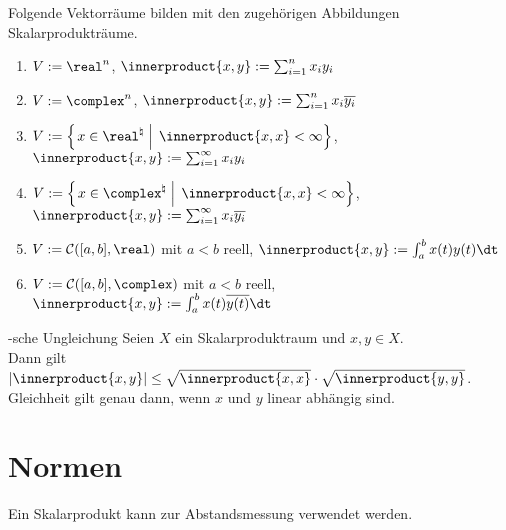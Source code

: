 \begin{Bsp}
    Folgende Vektorräume bilden mit den zugehörigen Abbildungen Skalarprodukträume.
    \begin{enumerate}[label=\emph{(\alph*)}]
        \item
        $V := \real^n$, $\innerproduct{x, y} := \sum_{i=1}^n x_i y_i$

        \item
        $V := \complex^n$, $\innerproduct{x, y} := \sum_{i=1}^n x_i \kk{y_i}$

        \item
        $V := \left\{\left.x \in \real^\natural \;\right|\; \innerproduct{x, x} < \infty\right\}$,
        $\innerproduct{x, y} := \sum_{i=1}^\infty x_i y_i$

        \item
        $V := \left\{\left.x \in \complex^\natural \;\right|\; \innerproduct{x, x} < \infty\right\}$,
        $\innerproduct{x, y} := \sum_{i=1}^\infty x_i \kk{y_i}$

        \item
        $V := \C([a,b], \real)$ mit $a < b$ reell, $\innerproduct{x, y} := \int_a^b x(t)y(t)\dt$

        \item
        $V := \C([a,b], \complex)$ mit $a < b$ reell, $\innerproduct{x, y} := \int_a^b x(t)\kk{y(t)}\dt$
    \end{enumerate}
\end{Bsp}

\begin{Satz}{-sche Ungleichung}
    Seien $X$ ein Skalarproduktraum und $x, y \in X$.\\
    Dann gilt $|\innerproduct{x, y}| \le \sqrt{\innerproduct{x, x}} \cdot \sqrt{\innerproduct{y, y}}$.
    Gleichheit gilt genau dann, wenn $x$ und $y$ linear abhängig sind.
\end{Satz}

\section{%
    Normen%
}

\begin{Bem}
    Ein Skalarprodukt kann zur Abstandsmessung verwendet werden.
\end{Bem}

